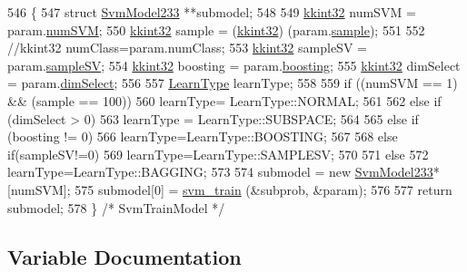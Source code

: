\begin{DoxyCode}
546 \{ 
547   \textcolor{keyword}{struct }\hyperlink{struct_s_v_m233_1_1_svm_model233}{SvmModel233} **submodel;
548 
549   \hyperlink{namespace_k_k_b_a8fa4952cc84fda1de4bec1fbdd8d5b1b}{kkint32} numSVM = param.\hyperlink{struct_s_v_m233_1_1svm__parameter_aac6ce26b15ecd7ce74d86a06982fae07}{numSVM};
550   \hyperlink{namespace_k_k_b_a8fa4952cc84fda1de4bec1fbdd8d5b1b}{kkint32} sample = (\hyperlink{namespace_k_k_b_a8fa4952cc84fda1de4bec1fbdd8d5b1b}{kkint32}) (param.\hyperlink{struct_s_v_m233_1_1svm__parameter_a63dd6c465973afa907155971db828985}{sample});
551 
552   \textcolor{comment}{//kkint32 numClass=param.numClass;}
553   \hyperlink{namespace_k_k_b_a8fa4952cc84fda1de4bec1fbdd8d5b1b}{kkint32}  sampleSV   = param.\hyperlink{struct_s_v_m233_1_1svm__parameter_a962ae17b97aa2011984e49b4f96aba8b}{sampleSV};
554   \hyperlink{namespace_k_k_b_a8fa4952cc84fda1de4bec1fbdd8d5b1b}{kkint32}  boosting   = param.\hyperlink{struct_s_v_m233_1_1svm__parameter_a1c7bc0954f80166ddd404a5eb9e0ca99}{boosting};
555   \hyperlink{namespace_k_k_b_a8fa4952cc84fda1de4bec1fbdd8d5b1b}{kkint32}  dimSelect  = param.\hyperlink{struct_s_v_m233_1_1svm__parameter_a58954ba2ce4bb3cbc2c61ab9f7a31c69}{dimSelect};
556 
557   \hyperlink{namespace_k_k_m_l_l_ad04a2a0ed8cef5043307eea95c6a31bc}{LearnType} learnType;
558 
559   \textcolor{keywordflow}{if}  ((numSVM == 1)  &&  (sample == 100))
560     learnType= LearnType::NORMAL;
561 
562   \textcolor{keywordflow}{else} \textcolor{keywordflow}{if}  (dimSelect > 0)
563     learnType = LearnType::SUBSPACE;
564 
565   \textcolor{keywordflow}{else} \textcolor{keywordflow}{if} (boosting != 0)
566     learnType=LearnType::BOOSTING;
567 
568   \textcolor{keywordflow}{else} \textcolor{keywordflow}{if}(sampleSV!=0)
569     learnType=LearnType::SAMPLESV;
570 
571   \textcolor{keywordflow}{else}
572     learnType=LearnType::BAGGING;
573 
574   submodel = \textcolor{keyword}{new} \hyperlink{struct_s_v_m233_1_1_svm_model233}{SvmModel233}* [numSVM];
575   submodel[0] = \hyperlink{namespace_s_v_m233_a0f6331f1d29cc73bc32f39c104b8d74c}{svm\_train} (&subprob,  &param);
576 
577   \textcolor{keywordflow}{return}  submodel;
578 \}  \textcolor{comment}{/* SvmTrainModel */}
\end{DoxyCode}


\subsection{Variable Documentation}
